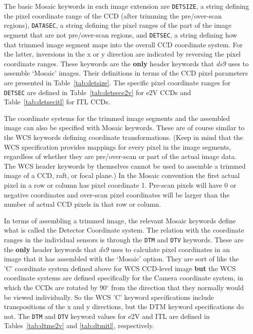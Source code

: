 \documentclass{article}[12pt]
\begin{document}
The basic Mosaic keywords in each image extension are {\tt DETSIZE}, a string defining the pixel coordinate range of the CCD (after trimming the pre/over-scan regions), {\tt DATASEC}, a string defining the pixel ranges of the part of the image segment that are not pre/over-scan regions, and {\tt DETSEC}, a string defining how that trimmed image segment maps into the overall CCD coordinate system.  For the latter, inversions in the x or y direction are indicated by reversing the pixel coordinate ranges.  These keywords are the {\bf only} header keywords that {\it ds9} uses to assemble `Mosaic' images.  Their definitions in terms of the CCD pixel parameters are presented in Table~\ref{tab:detsize}.  The specific pixel coordinate ranges for {\tt DETSEC} are defined in Table~\ref{tab:detsece2v} for e2V CCDs and Table~\ref{tab:detsecitl} for ITL CCDs.

The coordinate systems for the trimmed image segments and the assembled image can also be specified with Mosaic keywords.  These are of course similar to the WCS keywords defining coordinate transformations.  (Keep in mind that the WCS specification provides mappings for every pixel in the image segments, regardless of whether they are pre/over-scan or part of the actual image data.  The WCS header keywords by themselves cannot be used to assemble a trimmed image of a CCD, raft, or focal plane.)   In the Mosaic convention the first actual pixel in a row or column has pixel coordinate 1.  Pre-scan pixels will have 0 or negative coordinates and over-scan pixel coordinates will be larger than the number of actual CCD pixels in that row or column.

In terms of assembling a trimmed image, the relevant Mosaic keywords define what is called the Detector Coordinate system.  The relation with the coordinate ranges in the individual sensors is through the {\tt DTM} and {\tt DTV} keywords.  These are the {\bf only} header keywords that {\it ds9} uses to calculate pixel coordinates in an image that it has assembled with the `Mosaic' option.  They are sort of like the 'C' coordinate system defined above for WCS CCD-level image {\bf but} the WCS coordinate systems are defined specifically for the Camera coordinate system, in which the CCDs are rotated by 90$^\circ$ from the direction that they normally would be viewed individually.  So the WCS 'C' keyword specifications include transpositions of the x and y directions, but the DTM keyword specifications do not.  The {\tt DTM} and {\tt DTV} keyword values for e2V and ITL are defined in Tables~\ref{tab:dtme2v} and \ref{tab:dtmitl}, respectively.
\end{document}
